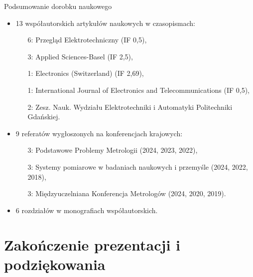 \documentclass[12pt, polish, aspectratio = 169]{slides}
\begin{document}
\begin{frame}{Podsumowanie dorobku naukowego}
\begin{itemize}
\item 13 współautorskich artykułów naukowych w czasopismach:
	\begin{itemize}
	\item[6:] Przegląd Elektrotechniczny (IF 0,5),
	\item[3:] Applied Sciences-Basel (IF 2,5),
	\item[1:] Electronics (Switzerland) (IF 2,69),
	\item[1:] International Journal of Electronics and Telecommunications (IF 0,5),
	\item[2:] Zesz. Nauk. Wydziału Elektrotechniki i Automatyki Politechniki Gdańskiej.
	\end{itemize}
\item 9 referatów wygłoszonych na konferencjach krajowych:
	\begin{itemize}
	\item[3:] Podstawowe Problemy Metrologii (2024, 2023, 2022),
	\item[3:] Systemy pomiarowe w badaniach naukowych i przemyśle (2024, 2022, 2018),
	\item[3:] Międzyuczelniana Konferencja Metrologów (2024, 2020, 2019).
	\end{itemize}
\item 6 rozdziałów w monografiach współautorskich.
\end{itemize}
\end{frame}

\section*{Zakończenie prezentacji i podziękowania}

\begin{frame}[plain]
\lastpage
\end{frame}
\end{document}
